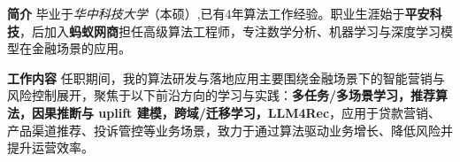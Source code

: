 %
%

\par{
{\textbf{简介}} 
毕业于\emph{华中科技大学}（本硕）,已有4年算法工作经验。职业生涯始于\textbf{平安科技}，后加入\textbf{蚂蚁网商}担任高级算法工程师，专注数学分析、机器学习与深度学习模型在金融场景的应用。


{\textbf{工作内容}} 
任职期间，我的算法研发与落地应用主要围绕金融场景下的智能营销与风险控制展开，聚焦于以下前沿方向的学习与实践：\textbf{多任务/多场景学习，推荐算法，因果推断与 uplift 建模，跨域/迁移学习，LLM4Rec}，应用于贷款营销、产品渠道推荐、投诉管控等业务场景，致力于通过算法驱动业务增长、降低风险并提升运营效率。
}